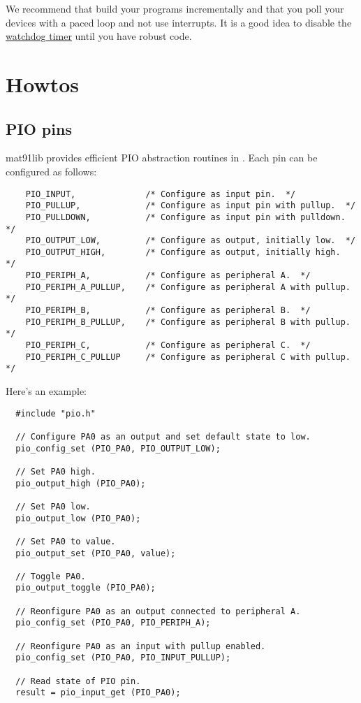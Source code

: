 We recommend that build your programs incrementally and that you poll
your devices with a paced loop and not use interrupts.  It is a good
idea to disable the \hyperref[watchdog-timer]{watchdog timer} until
you have robust code.

\section{Howtos}
\label{howtos}

\subsection{PIO pins}

mat91lib provides efficient PIO abstraction routines in
.  Each pin can be configured as follows:
%
\begin{verbatim}
    PIO_INPUT,              /* Configure as input pin.  */
    PIO_PULLUP,             /* Configure as input pin with pullup.  */
    PIO_PULLDOWN,           /* Configure as input pin with pulldown.  */
    PIO_OUTPUT_LOW,         /* Configure as output, initially low.  */
    PIO_OUTPUT_HIGH,        /* Configure as output, initially high.  */
    PIO_PERIPH_A,           /* Configure as peripheral A.  */
    PIO_PERIPH_A_PULLUP,    /* Configure as peripheral A with pullup.  */
    PIO_PERIPH_B,           /* Configure as peripheral B.  */
    PIO_PERIPH_B_PULLUP,    /* Configure as peripheral B with pullup.  */
    PIO_PERIPH_C,           /* Configure as peripheral C.  */
    PIO_PERIPH_C_PULLUP     /* Configure as peripheral C with pullup.  */
\end{verbatim}

Here's an example:
%
\begin{verbatim}
  #include "pio.h"

  // Configure PA0 as an output and set default state to low.
  pio_config_set (PIO_PA0, PIO_OUTPUT_LOW);

  // Set PA0 high.
  pio_output_high (PIO_PA0);

  // Set PA0 low.  
  pio_output_low (PIO_PA0);

  // Set PA0 to value.
  pio_output_set (PIO_PA0, value);  

  // Toggle PA0.  
  pio_output_toggle (PIO_PA0);    

  // Reonfigure PA0 as an output connected to peripheral A.
  pio_config_set (PIO_PA0, PIO_PERIPH_A);

  // Reonfigure PA0 as an input with pullup enabled.
  pio_config_set (PIO_PA0, PIO_INPUT_PULLUP);

  // Read state of PIO pin.
  result = pio_input_get (PIO_PA0);
\end{verbatim}


